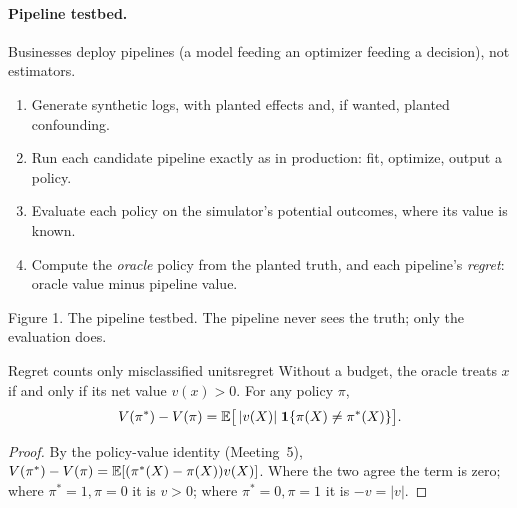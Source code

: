 \documentclass[11pt]{article}
\begin{document}
\paragraph{Pipeline testbed.} Businesses deploy pipelines (a model feeding an optimizer feeding a decision), not estimators.
\begin{enumerate}
  \item Generate synthetic logs, with planted effects and, if wanted, planted confounding.
  \item Run each candidate pipeline exactly as in production: fit, optimize, output a policy.
  \item Evaluate each policy on the simulator's potential outcomes, where its value is known.
  \item Compute the \emph{oracle} policy from the planted truth, and each pipeline's \emph{regret}: oracle value minus pipeline value.
\end{enumerate}

\begin{center}

\small Figure 1. The pipeline testbed. The pipeline never sees the truth; only the evaluation does.
\end{center}

\begin{prop}{Regret counts only misclassified units}{regret}
Without a budget, the oracle treats $x$ if and only if its net value $v(x) > 0$. For any policy $\pi$,
\[
  V(\pi^\ast) - V(\pi) = \mathbb{E}\big[\,|v(X)|\;\mathbf{1}\{\pi(X) \ne \pi^\ast(X)\}\big].
\]
\end{prop}
\begin{proof}
By the policy-value identity (Meeting~5), $V(\pi^\ast) - V(\pi) = \mathbb{E}[(\pi^\ast(X) - \pi(X))v(X)]$. Where the two agree the term is zero;
where $\pi^\ast = 1, \pi = 0$ it is $v > 0$; where $\pi^\ast = 0, \pi = 1$ it is $-v = |v|$.
\end{proof}
\end{document}

